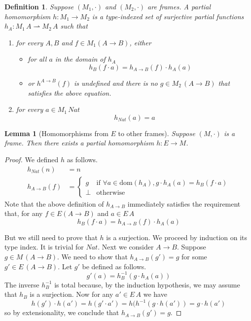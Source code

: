 \documentclass{tufte-handout}
\newcommand{\NATTY}[0]{\mathit{Nat}}
\newtheorem{lemma}[theorem]{Lemma}
\newtheorem{definition}{Definition}%
\begin{document}
\begin{definition}
  Suppose $(M_1,\cdot)$ and $(M_2,\cdot)$ are frames.  A \emph{partial
    homomorphism} $h : M_1 \to M_2$ is a type-indexed set of
  surjective partial functions $h_A : M_1\,A \rightharpoonup M_2\,A$
  such that
  \begin{enumerate}
  \item for every $A,B$ and $f \in M_1(A \to B)$,
    either
    \begin{itemize}
    \item for all $a$ in the domain of $h_A$
      \[
      h_B( f \cdot a ) = h_{A\to B}(f) \cdot h_A(a)
      \]
      
    \item or $h^{A\to B}(f)$ is undefined and there is no $g \in
      M_2\,(A\to B)$ that satisfies the above equation.
    \end{itemize}
  \item for every $a \in M_1\,\NATTY$
    \[
    h_{\NATTY}(a) = a
    \]
  \end{enumerate}

\end{definition}


\begin{lemma}[Homomorphisms from $E$ to other frames]
\label{lem:homo-model-frame}
  Suppose $(M,\cdot)$ is a frame. Then there exists a partial
  homomorphism $h : E \to M$.
\end{lemma}
\begin{proof}
  We defined $h$ as follows.
  \begin{align*}
    h_{\NATTY}(n) &= n \\
    h_{A \to B}(f) &= 
    \begin{cases}
      g & \text{if } \forall a \in \mathrm{dom}(h_A), g \cdot h_A(a) = h_B(f \cdot a)\\
      \bot & \text{otherwise }
    \end{cases}
  \end{align*}
  Note that the above definition of $h_{A \to B}$ immediately satisfies
  the requirement that, for any $f \in E(A\to B)$ and $a \in E\,A$
  \[
  h_B(f \cdot a) = h_{A \to B}(f) \cdot h_A(a)
  \]

  But we still need to prove that $h$ is a surjection. We proceed by
  induction on its type index.  It is trivial for $\NATTY$.  Next we
  consider $A \to B$.  Suppose $g \in M\,(A \to B)$. We need to show
  that $h_{A\to B}(g') = g$ for some $g' \in E\,(A\to B)$.  Let $g'$
  be defined as follows.
  \[
  g'(a) = h^{-1}_B(g \cdot h_A(a))
  \]
  The inverse $h^{-1}_B$ is total because, by the induction hypothesis,
  we may assume that $h_B$ is a surjection.
  Now for any $a' \in E\,A$ we have
  \[
  h(g') \cdot h(a') = h(g' \cdot a')
   = h(h^{-1}(g \cdot h(a'))
   = g \cdot h(a')
  \]
  so by extensionality, we conclude that $h_{A\to B}(g') = g$.

\end{proof}
\end{document}
